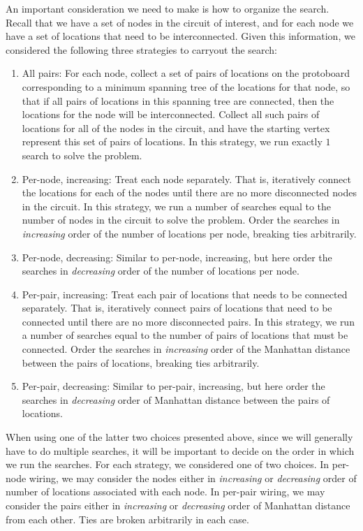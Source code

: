 An important consideration we need to make is how to organize the
search. Recall that we have a set of nodes in the circuit of interest, and for
each node we have a set of locations that need to be interconnected. Given this
information, we considered the following three strategies to carryout the
search:

\begin{enumerate}
\item All pairs: For each node, collect a set of pairs of locations on the
protoboard
corresponding to a minimum spanning tree of the locations for that node, so that
if all pairs of locations in this spanning tree are connected, then the
locations for the node will be interconnected. Collect all such pairs of
locations for all of the nodes in the circuit, and have the starting vertex
represent
this set of pairs of locations. In this strategy, we run exactly $1$ search to
solve the problem.
\item Per-node, increasing: Treat each node separately. That is, iteratively
connect the locations for each of the nodes until there are no more disconnected
nodes in the circuit. In this strategy, we run a number of searches equal to the
number of nodes in the circuit to solve the problem. Order the searches in
\emph{increasing} order of the number of locations per node, breaking ties
arbitrarily.
\item Per-node, decreasing: Similar to per-node, increasing, but here order the
searches in \emph{decreasing} order of the number of locations per node.
\item Per-pair, increasing: Treat each pair of locations that needs to be
connected separately. That is, iteratively connect pairs of locations that need
to be connected until there are no more disconnected pairs.
In this strategy, we run a number of searches equal to the number of pairs of
locations that must be connected. Order the searches in \emph{increasing} order
of the Manhattan distance between the pairs of locations, breaking ties
arbitrarily.
\item Per-pair, decreasing: Similar to per-pair, increasing, but here order the
searches in \emph{decreasing} order of Manhattan distance between the pairs of
locations.
\end{enumerate}

When using one of the latter two choices presented above, since we will
generally have to do multiple searches, it will be important to decide on the
order in which we run the searches. For each strategy, we considered one of
two choices. In per-node wiring, we may consider the nodes either in
\emph{increasing} or \emph{decreasing} order of number of locations associated
with each node. In per-pair wiring, we may consider the pairs either in
\emph{increasing} or \emph{decreasing} order of Manhattan distance from
each other. Ties are broken arbitrarily in each case.

